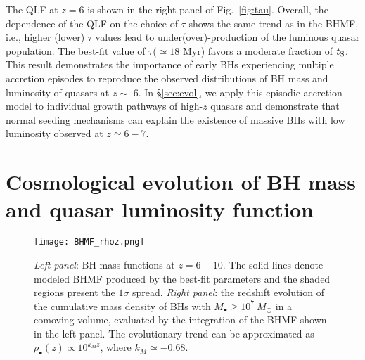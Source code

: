 \documentclass[twocolumn, twocolappendix]{aastex63}
\newcommand{\Msun}{M_\odot}
\newcommand{\Mbh}{M_\bullet}
\newcommand{\tlife}{\tau}
\newcommand{\red}[1]{\textcolor{red}{ #1}}
\begin{document}
\begin{CJK*}{UTF8}{gbsn}
The QLF at $z=6$ is shown in the right panel of Fig.~\ref{fig:tau}.
Overall, the dependence of the QLF on the choice of $\tau$ shows the same trend as in the BHMF,
i.e., higher (lower) $\tlife$ values lead to under(over)-production of the luminous quasar population.
The best-fit value of $\tlife (\simeq 18$ Myr) favors a moderate fraction of $t_{\rm S}$.
This result demonstrates the importance of early BHs experiencing multiple accretion episodes to 
reproduce the observed distributions of BH mass and luminosity of quasars at $z\sim$ 6.
In \S\ref{sec:evol}, we apply this episodic accretion model to individual growth pathways of high-$z$ quasars
and demonstrate that normal seeding mechanisms can explain the existence of massive BHs with low luminosity
observed at $z\simeq 6-7$.

\vspace{2mm}
\section{Cosmological evolution of BH mass and quasar luminosity function}\label{sec:cosm}


\begin{figure*}
\centering
\texttt{[image: BHMF\_rhoz.png]}
\caption{
{\it Left panel}: BH mass functions at $z=6-10$. 
The solid lines denote modeled BHMF produced by the best-fit parameters 
and the shaded regions present the $1\sigma$ spread. 
{\it Right panel}: the redshift evolution of the cumulative mass density of BHs with $\Mbh \geq 10^7~\Msun$ in a comoving volume, 
evaluated by the integration of the BHMF shown in the left panel.
The evolutionary trend can be approximated as $\rho_\bullet (z) \propto 10^{k_M z}$, where $k_M\simeq -0.68$.
}
\label{fig:BHMF_rhoz}
\vspace{4mm}
\end{figure*}






\end{CJK*}
\end{document}

